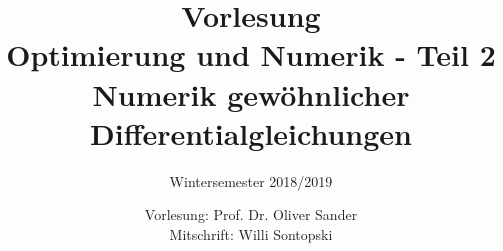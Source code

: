 \documentclass[]{scrreprt}
\title{
  Vorlesung\\
  Optimierung und Numerik - Teil 2\\
  Numerik gewöhnlicher Differentialgleichungen}
\subtitle{Wintersemester 2018/2019}
\author{
	Vorlesung: Prof. Dr. Oliver Sander\\
	Mitschrift: Willi Sontopski
}
\begin{document}
	\makeatletter
  	\renewcommand{\@pnumwidth}{2em}
  	\makeatother
  	
  	
	\maketitle
	\doclicenseThis
	\tableofcontents
	
	
	
	\setcounter{chapter}{0}
	\renewcommand{\thechapter}{\Alph{chapter}}
	
	\newcommand{\pathPrefix}{Loesungen/}

\end{document}
